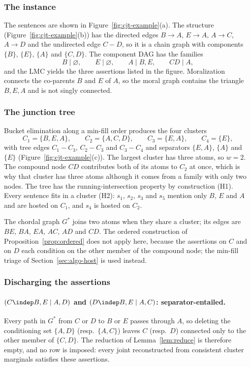 \subsubsection{The instance}

The sentences are shown in Figure~\ref{fig:cjt-example}(a). The structure
(Figure~\ref{fig:cjt-example}(b)) has the directed edges $B\to A$, $E\to A$,
$A\to C$, $A\to D$ and the undirected edge $C-D$, so it is a chain graph with
components $\{B\}$, $\{E\}$, $\{A\}$ and $\{C,D\}$. The component DAG has the
families
\[
  B\mid\varnothing,\qquad E\mid\varnothing,\qquad A\mid B,E,\qquad CD\mid A,
\]
and the LMC yields the three assertions listed in the figure. Moralization
connects the co-parents $B$ and $E$ of $A$, so the moral graph contains the
triangle $B,E,A$ and is not singly connected.

\subsubsection{The junction tree}

Bucket elimination along a min-fill order produces the four clusters
\[
  C_1=\{B,E,A\},\qquad C_2=\{A,C,D\},\qquad C_3=\{E,A\},\qquad C_4=\{E\},
\]
with tree edges $C_1-C_3$, $C_2-C_3$ and $C_3-C_4$ and separators
$\{E,A\}$, $\{A\}$ and $\{E\}$ (Figure~\ref{fig:cjt-example}(c)). The largest
cluster has three atoms, so $w=2$. The compound node $CD$ contributes both of its
atoms to $C_2$ at once, which is why that cluster has three atoms although it
comes from a family with only two nodes. The tree has the running-intersection
property by construction (H1). Every sentence fits in a cluster (H2): $s_1$,
$s_2$, $s_3$ and $s_5$ mention only $B$, $E$ and $A$ and are hosted on $C_1$, and
$s_4$ is hosted on $C_2$.

The chordal graph $G^\ast$ joins two atoms when they share a cluster; its edges
are $BE$, $BA$, $EA$, $AC$, $AD$ and $CD$. The ordered construction of
Proposition~\ref{prop:ordered} does not apply here, because the assertions on $C$
and on $D$ each condition on the other member of the compound node; the
min-fill triage of Section~\ref{sec:algo-host} is used instead.

\subsubsection{Discharging the assertions}

\paragraph{$(C\indep B,E\mid A,D)$ and $(D\indep B,E\mid A,C)$: separator-entailed.}
Every path in $G^\ast$ from $C$ or $D$ to $B$ or $E$ passes through $A$, so
deleting the conditioning set $\{A,D\}$ (resp.\ $\{A,C\}$) leaves $C$ (resp.\ $D$)
connected only to the other member of $\{C,D\}$. The reduction of
Lemma~\ref{lem:reduce} is therefore empty, and no row is imposed: every joint
reconstructed from consistent cluster marginals satisfies these assertions.

